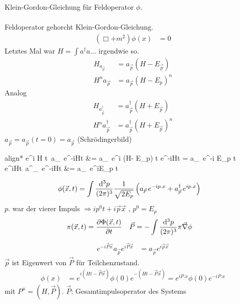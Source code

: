 Klein-Gordon-Gleichung für Feldoperator $\phi$.
\\ \\	
Feldoperator gehorcht Klein-Gordon-Gleichung.	
	\begin{align*}
		(\Box + m^2) \phi(x) &= 0
	\end{align*}
Letztes Mal war $H = \int a^\dagger a \ldots$ irgendwie so.
	\begin{align*}
		H_{a_{\vec{p}}} &= a_{\vec{p}}(H - E_{\vec{p}}) \\
		H^n a_{\vec{p}} &= a_{\vec{p}}(H - E_p)^n
	\end{align*}
Analog 
	\begin{align*}
		H_{a^\dagger_{\vec{p}}} &= a^\dagger_{\vec{p}}(H + E_{\vec{p}}) \\
		H^n a^\dagger_{\vec{p}} &= a^\dagger_{\vec{p}} (H + E_{\vec{p}})^n
	\end{align*}
$a_{\vec{p}} = a_{\vec{p}} (t = 0) = a_{\vec{p}}$ (Schrödingerbild) 
	\begin{empheq}[box = \boxed]{align*}
		e^{i H t} \,a_{}\, e^{-iHt} &= a_{} \,e^{i (H- E_p) t} e^{-iHt} = a_{} \,e^{-i E_p t} \\
		e^{iHt} \,a^\dagger_{}\, e^{-iHt} &= a\dagger_{} \,e^{iE_p t}
	\end{empheq}
	\begin{align*}
		\phi (\vec{x}, t) &= \int \frac{\mathrm{d}^3 p}{(2 \pi)^3} \frac{1}{\sqrt{2 E_p}}
		\left(
			a_{\vec{p}} \,e^{-ip. x} + a^\dagger_{\vec{p}} \,e^{ip. x}
		\right)
	\end{align*}
$p.$ war der vierer Impuls $\Rightarrow ip^0t + i \vec{p} \vec{x}$ , $p^0 = E_p$
	\begin{align*}
		\pi(\vec{x}, t) &= \frac{\partial \Phi (\vec{x}, t)}{\partial t} &
		\vec{P} &= -\int \frac{\mathrm{d}^3 p}{(2\pi)^3} \pi \vec{\nabla} \phi
	\end{align*}
	\begin{align*}
		e^{-i \vec{P} \vec{x}} a_{\vec{p}} e^{i \vec{P} \vec{x}} &= 
		a_{\vec{p}} e^{i \vec{p} \vec{x}}
	\end{align*}
$\vec{p}$ ist Eigenwert von $\vec{P}$ für Teilchenzustand.
	\begin{align*}
		\phi(x) &= e^{i(Ht - \vec{P} \vec{x})} \phi (0) e^{- (Ht- \vec{P} \vec{x})} 
		= e^{i P. x} \phi(0) e^{-i P. x}
	\end{align*}
mit $P^\mu = (H, \vec{P})$. $\vec{P}$: Gesamtimpulsoperator des  Systems                              